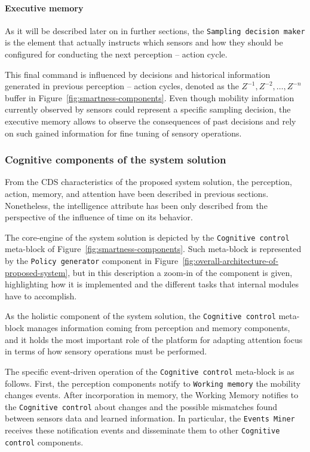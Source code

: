 \documentclass[ENG,PhD]{cinvestav}
\begin{document}
\paragraph{Executive memory}
As it will be described later on in further sections, the \texttt{Sampling decision maker} is the element that actually instructs which sensors and how they should be configured for conducting the next perception -- action cycle.

This final command is influenced by decisions and historical information generated in previous perception -- action cycles, denoted as the $Z^{-1},Z^{-2},\ldots,Z^{-n}$ buffer in Figure~\ref{fig:smartness-components}.
Even though mobility information currently observed by sensors could represent a specific sampling decision, the executive memory allows to observe the consequences of past decisions and rely on such gained information for fine tuning of sensory operations.


\subsubsection{Cognitive components of the system solution}
From the CDS characteristics of the proposed system solution, the perception, action, memory, and attention have been described in previous sections.
Nonetheless, the intelligence attribute has been only described from the perspective of the influence of time on its behavior.

The core-engine of the system solution is depicted by the \texttt{Cognitive control} meta-block of Figure~\ref{fig:smartness-components}.
Such meta-block is represented by the \texttt{Policy generator} component in Figure~\ref{fig:overall-architecture-of-proposed-system}, but in this description a zoom-in of the component is given, highlighting how it is implemented and the different tasks that internal modules have to accomplish.

As the holistic component of the system solution, the \texttt{Cognitive control} meta-block manages information coming from perception and memory components, and it holds the most important role of the platform for adapting attention focus in terms of how sensory operations must be performed.

The specific event-driven operation of the \texttt{Cognitive control} meta-block is as follows.
First, the perception components notify to \texttt{Working memory} the mobility changes events.
After incorporation in memory, the Working Memory notifies to the \texttt{Cognitive control} about changes and the possible mismatches found between sensors data and learned information.
In particular, the \texttt{Events Miner} receives these notification events and disseminate them to other \texttt{Cognitive control} components.
\end{document}
